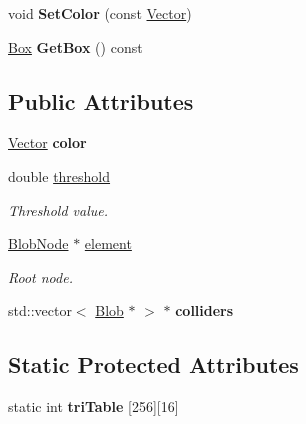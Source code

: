 \begin{DoxyCompactItemize}
\item 
\hypertarget{class_blob_ae4aa3fd1e62680b0eab23da468171e3a}{
void {\bfseries SetColor} (const \hyperlink{class_vector}{Vector})}
\label{class_blob_ae4aa3fd1e62680b0eab23da468171e3a}

\item 
\hypertarget{class_blob_a60bc71856d1ecd43812a52f7898e6b5e}{
\hyperlink{class_box}{Box} {\bfseries GetBox} () const }
\label{class_blob_a60bc71856d1ecd43812a52f7898e6b5e}

\end{DoxyCompactItemize}
\subsection*{Public Attributes}
\begin{DoxyCompactItemize}
\item 
\hypertarget{class_blob_a13c52fdfacc852be7e2a5dd19ddc13c1}{
\hyperlink{class_vector}{Vector} {\bfseries color}}
\label{class_blob_a13c52fdfacc852be7e2a5dd19ddc13c1}

\item 
\hypertarget{class_blob_a663794d2bb5e04a874fdf88812fc3f9c}{
double \hyperlink{class_blob_a663794d2bb5e04a874fdf88812fc3f9c}{threshold}}
\label{class_blob_a663794d2bb5e04a874fdf88812fc3f9c}

\begin{DoxyCompactList}\small\item\em Threshold value. \item\end{DoxyCompactList}\item 
\hypertarget{class_blob_a032980f6ea07819b42a95d6998f7bf30}{
\hyperlink{class_blob_node}{BlobNode} $\ast$ \hyperlink{class_blob_a032980f6ea07819b42a95d6998f7bf30}{element}}
\label{class_blob_a032980f6ea07819b42a95d6998f7bf30}

\begin{DoxyCompactList}\small\item\em Root node. \item\end{DoxyCompactList}\item 
\hypertarget{class_blob_ac2f70628bb40012ebc4ac3c7416e9dea}{
std::vector$<$ \hyperlink{class_blob}{Blob} $\ast$ $>$ $\ast$ {\bfseries colliders}}
\label{class_blob_ac2f70628bb40012ebc4ac3c7416e9dea}

\end{DoxyCompactItemize}
\subsection*{Static Protected Attributes}
\begin{DoxyCompactItemize}
\item 
\hypertarget{class_blob_af12d42c490f868ad34ffb1f8cdd72f9b}{
static int {\bfseries triTable} \mbox{[}256\mbox{]}\mbox{[}16\mbox{]}}
\label{class_blob_af12d42c490f868ad34ffb1f8cdd72f9b}

\end{DoxyCompactItemize}


